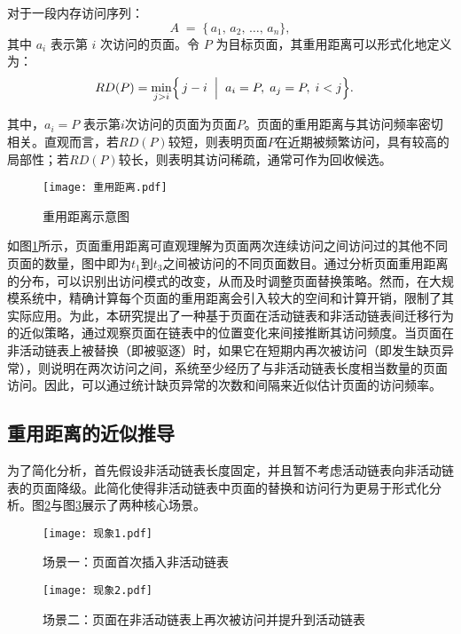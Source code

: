 对于一段内存访问序列：
\[
  A \;=\;\{\,a_1,\,a_2,\,\dots,\,a_n\},
\]
其中 \(a_i\) 表示第 \(i\) 次访问的页面。令 \(P\) 为目标页面，其重用距离可以形式化地定义为：
\begin{align}
\label{eq:rd_def}
  RD(P) 
  &= 
  \min_{j>i}\Bigl\{\,j - i
    \;\Bigm|\;
    a_i = P,\;
    a_j = P,\;
    i < j
  \Bigr\}.
\end{align}

其中，\(a_i=P\) 表示第\(i\)次访问的页面为页面\(P\)。页面的重用距离与其访问频率密切相关。直观而言，若\(RD(P)\)较短，则表明页面\(P\)在近期被频繁访问，具有较高的局部性；若\(RD(P)\)较长，则表明其访问稀疏，通常可作为回收候选。

\begin{figure}[htbp]
  \centering
  \texttt{[image: 重用距离.pdf]}
  \caption{重用距离示意图}
  \label{fig:refault_distance}
\end{figure}


如图\ref{fig:refault_distance}所示，页面重用距离可直观理解为页面两次连续访问之间访问过的其他不同页面的数量，图中即为\(t_1\)到\(t_3\)之间被访问的不同页面数目。通过分析页面重用距离的分布，可以识别出访问模式的改变，从而及时调整页面替换策略。然而，在大规模系统中，精确计算每个页面的重用距离会引入较大的空间和计算开销，限制了其实际应用。为此，本研究提出了一种基于页面在活动链表和非活动链表间迁移行为的近似策略，通过观察页面在链表中的位置变化来间接推断其访问频度。当页面在非活动链表上被替换（即被驱逐）时，如果它在短期内再次被访问（即发生缺页异常），则说明在两次访问之间，系统至少经历了与非活动链表长度相当数量的页面访问。因此，可以通过统计缺页异常的次数和间隔来近似估计页面的访问频率。

\subsection{重用距离的近似推导}

为了简化分析，首先假设非活动链表长度固定，并且暂不考虑活动链表向非活动链表的页面降级。此简化使得非活动链表中页面的替换和访问行为更易于形式化分析。图\ref{fig:现象1}与图\ref{fig:现象2}展示了两种核心场景。

\begin{figure}[htbp]
  \centering
  \texttt{[image: 现象1.pdf]}
  \caption{场景一：页面首次插入非活动链表}
  \label{fig:现象1}
\end{figure}

\begin{figure}[htbp]
  \centering
  \texttt{[image: 现象2.pdf]}
  \caption{场景二：页面在非活动链表上再次被访问并提升到活动链表}
  \label{fig:现象2}
\end{figure}

